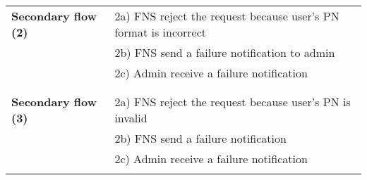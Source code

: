 \documentclass[a4paper,11pt]{article}
\begin{document}
\begin{tabular}{|p{4cm}|p{10cm}|}
    \\ \hline \rowcolor{Gray} & \\ \hline 
     
    \textbf{Secondary flow (2)} & 
    2a) FNS reject the request because user's PN format is incorrect \\&
    2b) FNS send a failure notification to admin\\&
    2c) Admin receive a failure notification \\& 
    
   \\ \hline \rowcolor{Gray} & \\ \hline
    
    \textbf{Secondary flow (3)} & 
    2a) FNS reject the request because user's PN is invalid \\&
    2b) FNS send a failure notification \\&
    2c) Admin receive a failure notification \\&
    
    \\ \hline 
\end{tabular}
\end{document}
